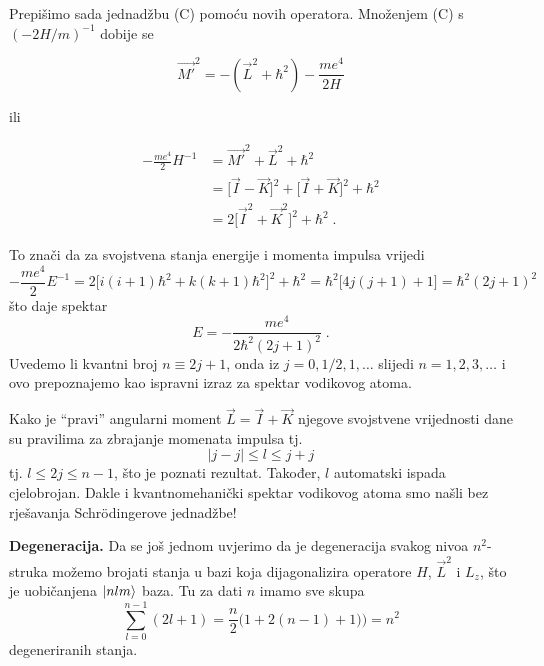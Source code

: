 Prepišimo sada jednadžbu (C) pomoću novih operatora. Množenjem (C)
s $(-2H/m)^{-1}$ dobije se

\begin{equation}
   \vec{M'}^2 = -(\vec{L}^2 + \hbar^2) - \frac{me^4}{2H}
\end{equation}

ili

\begin{align}
 -\frac{me^4}{2}H^{-1} &= \vec{M'}^{2} + \vec{L}^2 + \hbar^2 \\
&=\big[\vec{I} - \vec{K}\big]^2 + 
\big[\vec{I} + \vec{K}\big]^2  + \hbar^2\\
&=2\big[\vec{I}^2 + \vec{K}^2 \big]^2 + \hbar^2  \;.
\end{align}

To znači da za svojstvena stanja energije i momenta impulsa vrijedi
\begin{equation}
-\frac{me^4}{2}E^{-1} = 2\big[i(i +1)\hbar^2 + k(k+1)\hbar^2 
\big]^2 + \hbar^2   = \hbar^2 \big[ 4j(j+1) +1 \big] = \hbar^2 (2j+1)^2
\end{equation}
što daje spektar
\begin{equation}
   E = - \frac{m e^4}{2\hbar^2 (2j+1)^2} \;.
\end{equation}
Uvedemo li kvantni broj $n\equiv 2j+1$, onda iz $j=0,1/2, 1,\ldots$
slijedi $n=1,2,3,\ldots$ i ovo prepoznajemo kao ispravni izraz
za spektar vodikovog atoma.

Kako je ``pravi'' angularni moment $\vec{L}=\vec{I} +
\vec{K}$ njegove svojstvene vrijednosti dane su pravilima
za zbrajanje momenata impulsa tj.
\begin{equation}
    |j - j| \leq l \leq j + j
\end{equation}
tj. $l \leq 2j \leq n-1$, što je poznati rezultat. Također, $l$
automatski ispada cjelobrojan. Dakle i kvantnomehanički spektar
vodikovog atoma smo našli bez rješavanja Schr\"{o}dingerove
jednadžbe!


\textbf{Degeneracija.} Da se još jednom uvjerimo da je degeneracija
svakog nivoa $n^2$-struka  možemo brojati stanja u bazi koja
dijagonalizira operatore $H$, $\vec{L}^2$ i $L_z$, što je
uobičanjena $| nlm \rangle$ baza. Tu za dati $n$ imamo sve skupa
\begin{equation}
 \sum_{l=0}^{n-1} (2l+1) =\frac{n}{2}\big(1+2(n-1)+1)\big) = n^2
\end{equation}
degeneriranih stanja.

